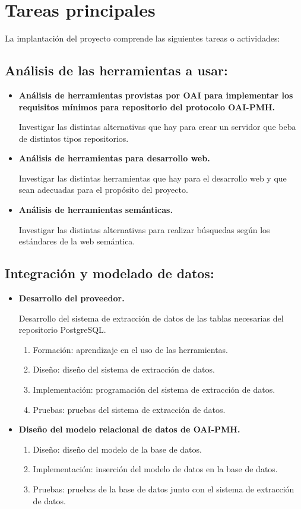 \section{Tareas principales}

La implantación del proyecto comprende las siguientes tareas o actividades: 

\subsection{Análisis de las herramientas a usar:}

\begin{itemize}
	\item \textbf{Análisis de herramientas provistas por OAI para implementar los requisitos mínimos para repositorio del protocolo OAI-PMH.}

	Investigar las distintas alternativas que hay para crear un servidor que beba de distintos tipos repositorios.
	\item \textbf{Análisis de herramientas para desarrollo web.}

	Investigar las distintas herramientas que hay para el desarrollo web y que sean adecuadas para el propósito del proyecto.
	\item \textbf{Análisis de herramientas semánticas.}

	Investigar las distintas alternativas para realizar búsquedas según los estándares de la web semántica. 
\end{itemize}

\subsection{Integración y modelado de datos:}

\begin{itemize}
	\item \textbf{Desarrollo del proveedor.}
	
	Desarrollo del sistema de extracción de datos de las tablas necesarias del repositorio PostgreSQL.

	\begin{enumerate}
		\item Formación: aprendizaje en el uso de las herramientas.
		\item Diseño: diseño del sistema de extracción de datos.
		\item Implementación: programación del sistema de extracción de datos.
		\item Pruebas: pruebas del sistema de extracción de datos.
	\end{enumerate}
	\item \textbf{Diseño del modelo relacional de datos de OAI-PMH.}
	\begin{enumerate}
		\item Diseño: diseño del modelo de la base de datos. 
		\item Implementación: inserción del modelo de datos en la base de datos.
		\item Pruebas: pruebas de la base de datos junto con el sistema de extracción de datos.
	\end{enumerate}
\end{itemize}

